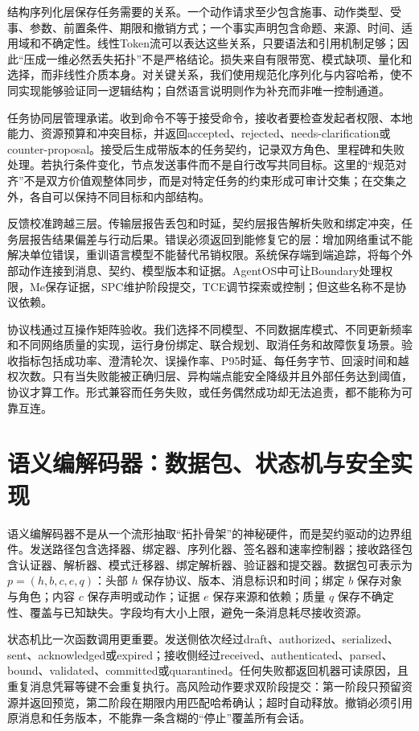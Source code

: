 结构序列化层保存任务需要的关系。一个动作请求至少包含施事、动作类型、受事、参数、前置条件、期限和撤销方式；一个事实声明包含命题、来源、时间、适用域和不确定性。线性Token流可以表达这些关系，只要语法和引用机制足够；因此“压成一维必然丢失拓扑”不是严格结论。损失来自有限带宽、模式缺项、量化和选择，而非线性介质本身。对关键关系，我们使用规范化序列化与内容哈希，使不同实现能够验证同一逻辑结构；自然语言说明则作为补充而非唯一控制通道。

任务协同层管理承诺。收到命令不等于接受命令，接收者要检查发起者权限、本地能力、资源预算和冲突目标，并返回accepted、rejected、needs-clarification或counter-proposal。接受后生成带版本的任务契约，记录双方角色、里程碑和失败处理。若执行条件变化，节点发送事件而不是自行改写共同目标。这里的“规范对齐”不是双方价值观整体同步，而是对特定任务的约束形成可审计交集；在交集之外，各自可以保持不同目标和内部结构。

反馈校准跨越三层。传输层报告丢包和时延，契约层报告解析失败和绑定冲突，任务层报告结果偏差与行动后果。错误必须返回到能修复它的层：增加网络重试不能解决单位错误，重训语言模型不能替代吊销权限。系统保存端到端追踪，将每个外部动作连接到消息、契约、模型版本和证据。AgentOS中可让Boundary处理权限，Me保存证据，SPC维护阶段提交，TCE调节探索或控制；但这些名称不是协议依赖。

协议栈通过互操作矩阵验收。我们选择不同模型、不同数据库模式、不同更新频率和不同网络质量的实现，运行身份绑定、联合规划、取消任务和故障恢复场景。验收指标包括成功率、澄清轮次、误操作率、P95时延、每任务字节、回滚时间和越权次数。只有当失败能被正确归层、异构端点能安全降级并且外部任务达到阈值，协议才算工作。形式兼容而任务失败，或任务偶然成功却无法追责，都不能称为可靠互连。

\section{语义编解码器：数据包、状态机与安全实现}
\label{sec:semantic_serdes}

语义编解码器不是从一个流形抽取“拓扑骨架”的神秘硬件，而是契约驱动的边界组件。发送路径包含选择器、绑定器、序列化器、签名器和速率控制器；接收路径包含认证器、解析器、模式迁移器、绑定解析器、验证器和提交器。数据包可表示为 $p=(h,b,c,e,q)$：头部 $h$ 保存协议、版本、消息标识和时间；绑定 $b$ 保存对象与角色；内容 $c$ 保存声明或动作；证据 $e$ 保存来源和依赖；质量 $q$ 保存不确定性、覆盖与已知缺失。字段均有大小上限，避免一条消息耗尽接收资源。

状态机比一次函数调用更重要。发送侧依次经过draft、authorized、serialized、sent、acknowledged或expired；接收侧经过received、authenticated、parsed、bound、validated、committed或quarantined。任何失败都返回机器可读原因，且重复消息凭幂等键不会重复执行。高风险动作要求双阶段提交：第一阶段只预留资源并返回预览，第二阶段在期限内用匹配哈希确认；超时自动释放。撤销必须引用原消息和任务版本，不能靠一条含糊的“停止”覆盖所有会话。

